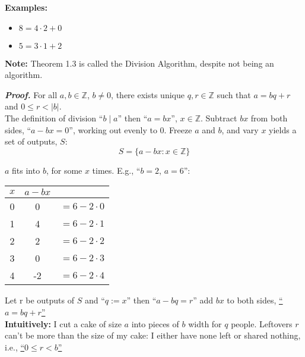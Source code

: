 \noindent
\textbf{Examples:}
\begin{itemize}
    \item $8=4\cdot2+0$
    \item $5=3\cdot1+2$
\end{itemize}

\begin{Note}
    \textbf{Note:} Theorem 1.3 is called the Division Algorithm, despite not being an algorithm.
\end{Note}

\newpage

\begin{Proof} 
    \textit{\textbf{Proof.}} For all $a,b\in\mathbb{Z}$, $b\neq0$, there exists unique $q,r\in\mathbb{Z}$ such that $a=bq+r$ and $0\leq r<|b|$.\\

    \noindent
    The definition of division ``$b\mid a$'' then ``$a=bx$'', $x\in\mathbb{Z}$. Subtract $bx$ from both sides, ``$a-bx=0$'', working out evenly to 0.
    Freeze $a$ and $b$, and vary $x$ yields a set of outputs, $S$:
    \large{$$S=\{a-bx:x\in\mathbb{Z}\}$$}
    \normalsize
    \begin{center}
        $a$ fits into $b$, for some $x$ times. E.g., ``$b=2$, $a=6$'':
    \end{center}
    \begin{center}
        \begin{tabular}{c|cc}
            $x$ & $a-bx$                \\
            \hline
            0   & 0      & $=6-2\cdot0$ \\
            1   & 4      & $=6-2\cdot1$ \\
            2   & 2      & $=6-2\cdot2$ \\
            3   & 0      & $=6-2\cdot3$ \\
            \hline
            4   & -2     & $=6-2\cdot4$ \\
        \end{tabular}
    \end{center}

    \noindent
    Let r be outputs of $S$ and ``$q:=x$'' then ``$a-bq=r$'' add $bx$ to both sides, \underline{``$a=bq+r$''}\\

    \noindent
    \textbf{Intuitively:} I cut a cake of size $a$ into pieces of $b$ width for $q$ people. Leftovers $r$
    can't be more than the size of my cake: I either have none left or shared nothing, i.e., \underline{``$0\leq r<b$''}\\


\end{Proof}
